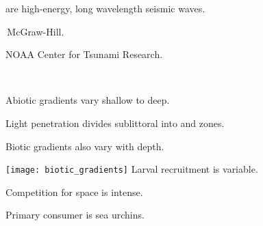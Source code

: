 \documentclass[t]{beamer}
\begin{document}
{
\begin{frame}[b]{ are high-energy, long wavelength seismic waves.}

\hfill\tiny\textcopyright\,McGraw-Hill.
\end{frame}
}


{
\begin{frame}[b]

\hfill\tiny NOAA Center for Tsunami Research.
\end{frame}
}



{
\begin{frame}[b]

\hfill\tiny\textcolor{white}{Sue Scott, Darwin Initiative, Flickr Creative Commons.}
\end{frame}
}

{
\begin{frame}[t]{Abiotic gradients vary shallow to deep.}

\end{frame}
}

{
\begin{frame}[t]{Light penetration divides sublittoral into  and  zones.}

\end{frame}
}

\begin{frame}[t]{Biotic gradients also vary with depth.}
\begin{multicols}{2}
	\texttt{[image: biotic\_gradients]}
\columnbreak
	\hangpara Larval recruitment is variable.
	
	\hangpara Competition for space is intense.
	
	\hangpara Primary consumer is sea urchins.
	
\end{multicols}
\end{frame}
\end{document}
